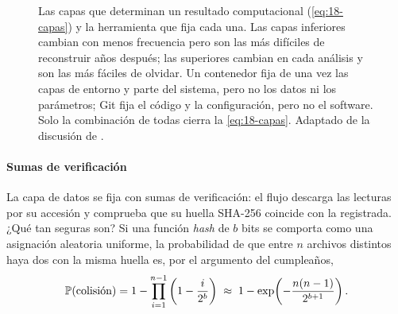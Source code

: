 \begin{figure}[t]
\centering
{}
\caption[Las capas de la reproducibilidad]{Las capas que determinan un resultado computacional (\cref{eq:18-capas}) y la herramienta que fija cada una. Las capas inferiores cambian con menos frecuencia pero son las más difíciles de reconstruir años después; las superiores cambian en cada análisis y son las más fáciles de olvidar. Un contenedor fija de una vez las capas de entorno y parte del sistema, pero no los datos ni los parámetros; Git fija el código y la configuración, pero no el software. Solo la combinación de todas cierra la \cref{eq:18-capas}. Adaptado de la discusión de \textcite{c18-gruning2018practical}.}
\label{fig:18-capas}
\end{figure}

\paragraph{Sumas de verificación} La capa de datos se fija con sumas de verificación: el flujo descarga las lecturas por su accesión y comprueba que su huella SHA-256 coincide con la registrada. ¿Qué tan seguras son? Si una función \emph{hash} de $b$ bits se comporta como una asignación aleatoria uniforme, la probabilidad de que entre $n$ archivos distintos haya dos con la misma huella es, por el argumento del cumpleaños,
\begin{equation}\label{eq:18-cumple}
\mathbb{P}(\text{colisión}) = 1 - \prod_{i=1}^{n-1}\left(1-\frac{i}{2^b}\right) \;\approx\; 1 - \exp\!\left(-\frac{n(n-1)}{2^{b+1}}\right).
\end{equation}


